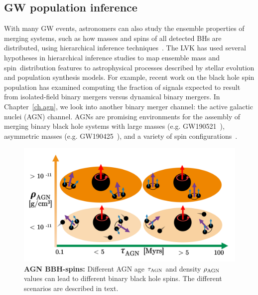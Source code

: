 \subsection{GW population inference}

With many GW events, astronomers can also study the ensemble properties of merging systems, such as how masses and spins of all detected BHs are distributed, using hierarchical inference techniques~\cite{gwtc12population, gwtc3population}.
The LVK has used several hypotheses in hierarchical inference studies to map ensemble mass and spin distribution features to astrophysical processes  described by stellar evolution and population synthesis models.
For example, recent work on the black hole spin population has examined computing the fraction of signals expected to result from isolated-field binary mergers versus dynamical binary mergers.
In Chapter~\ref{ch.agn}, we look into another binary merger channel: the active galactic nuclei (AGN) channel.
AGNs are promising environments for the assembly of merging binary black hole systems with large masses (e.g. GW190521~\cite{mckernan2020black}), asymmetric masses (e.g. GW190425~\cite{mckernan2022ligo}), and a variety of spin configurations~\cite{tagawa2020spin, Ford:2021:arXiv, mckernan2020monte}. 

\begin{figure}
\begin{center}
  \centerline{\includegraphics[width=1.\linewidth]{src/figures/agn_spins.png}}
  \caption{\textbf{AGN BBH-spins:} Different AGN age $\tau_{\rm AGN}$ and density $\rho_{\rm AGN}$ values can lead to different binary black hole spins. The different scenarios are described in text.}
  \label{fig:agn_spins}
\end{center}
\end{figure}



